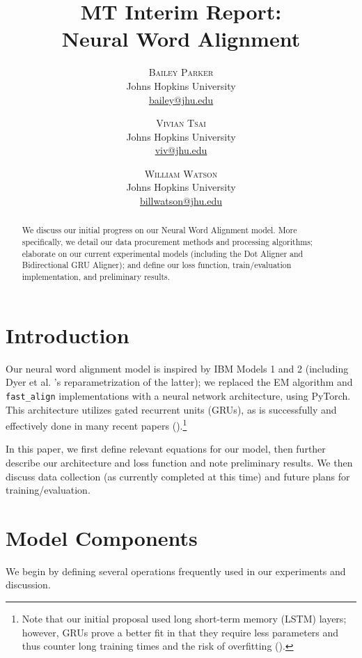 \documentclass[twoside,twocolumn]{article}
\title{MT Interim Report: \\ Neural Word Alignment}
\author{%
\textsc{Bailey Parker} \\[1ex]
\normalsize Johns Hopkins University \\
\normalsize \href{mailto:bailey@jhu.edu}{bailey@jhu.edu}
 \and
 \textsc{Vivian Tsai} \\[1ex]
\normalsize Johns Hopkins University \\
\normalsize \href{mailto:viv@jhu.edu}{viv@jhu.edu}
 \and
  \textsc{William Watson} \\[1ex]
\normalsize Johns Hopkins University \\
\normalsize \href{mailto:billwatson@jhu.edu}{billwatson@jhu.edu}
}
\date{}
\begin{document}
\maketitle




\begin{abstract}
We discuss our initial progress on our Neural Word Alignment model. More
specifically, we detail our data procurement methods and processing algorithms;
elaborate on our current experimental models (including the Dot Aligner and
Bidirectional GRU Aligner); and define our loss function, train/evaluation
implementation, and preliminary results.
\end{abstract}

\section{Introduction}
Our neural word alignment model is inspired by IBM Models 1 and 2 (including
Dyer et al. \cite{dyer2013simple}'s reparametrization of the latter); we
replaced the EM algorithm and \verb|fast_align| implementations with a neural
network architecture, using PyTorch. This architecture utilizes gated recurrent
units (GRUs), as is successfully and effectively done in many recent papers
(\cite{bahdanau2014neural}).\footnote{Note that our initial proposal used
long short-term memory (LSTM) layers; however, GRUs prove a better fit in that
they require less parameters and thus counter long training times and the risk
of overfitting (\cite{koehn2019neural}).}

In this paper, we first define relevant equations for our model, then further
describe our architecture and loss function and note preliminary results.
We then discuss data collection (as currently completed at this time) and future
plans for training/evaluation.

\section{Model Components}
We begin by defining several operations frequently used in our experiments
and discussion.
\end{document}
